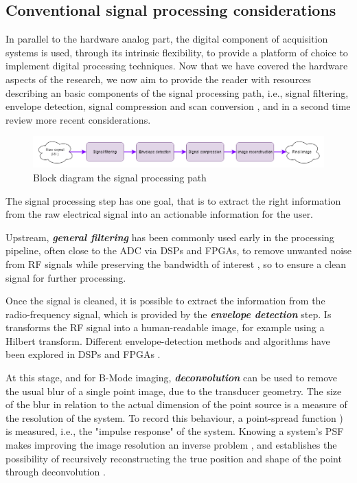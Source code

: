\documentclass{article}
\begin{document}
\subsection{Conventional signal processing considerations}

In parallel to the hardware analog part, the digital component of acquisition systems is used, through its intrinsic flexibility, to provide a platform of choice to implement digital processing techniques. Now that we have covered the hardware aspects of the research, we now aim to provide the reader with resources describing an basic components of the signal processing path, i.e., signal filtering, envelope detection, signal compression and scan conversion \cite{basoglu_computing_1998}, and in a second time review more recent considerations.

\begin{figure}[H]
 \includegraphics[width=\linewidth]{Fig2.png}
 \caption{Block diagram the signal processing path}
 \label{fig:SigProc}
\end{figure}

The signal processing step has one goal, that is to extract the right information from the raw electrical signal into an actionable information for the user. 

Upstream, \textbf{\textit{general filtering}} has been commonly used early in the processing pipeline, often close to the ADC via DSPs and FPGAs, to remove unwanted noise from RF signals while preserving the bandwidth of interest \cite{assef_modeling_2019, levesque_real-time_2009}, so to ensure a clean signal for further processing.

Once the signal is cleaned, it is possible to extract the information from the radio-frequency signal, which is provided by the \textbf{\textit{envelope detection}} step. Is transforms the RF signal into a human-readable image, for example using a Hilbert transform. Different envelope-detection methods and algorithms have been explored in DSPs and FPGAs \cite{chang_novel_2007, assef_fpga_2019, assef_modeling_2018}.

At this stage, and for B-Mode imaging, \textbf{\textit{deconvolution}} can be used to remove the usual blur of a single point image, due to the transducer geometry. The size of the blur in relation to the actual dimension of the point source is a measure of the resolution of the system. To record this behaviour, a point-spread function ) is measured, i.e., the "impulse response" of the system.  Knowing a system’s PSF makes improving the image resolution an inverse problem  \cite{jensen_deconvolution_1993,dalitz_point_2015}, and establishes the possibility of recursively reconstructing the true position and shape of the point through deconvolution \cite{dalitz_point_2015}.  
\end{document}
